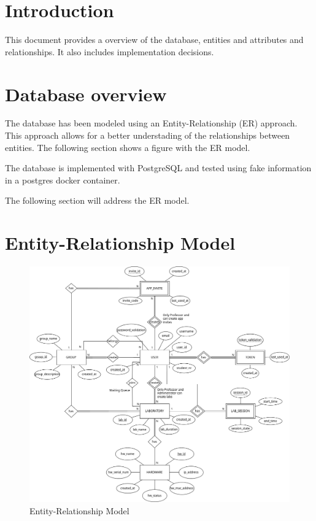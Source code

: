 \documentclass[a4paper,twoside,11pt]{article}
\begin{document}
\section*{Introduction}
This document provides a overview of the database, entities and attributes and relationships. 
It also includes implementation decisions.

\section*{Database overview}
The database has been modeled using an Entity-Relationship (ER) approach.
This approach allows for a better understading of the relationships between entities. The following section shows a figure with the ER model.

The database is implemented with PostgreSQL and tested using fake information in a postgres docker container.

The following section will address the ER model.
\section*{Entity-Relationship Model}
\begin{figure}[htbp]
	\centering
	\includegraphics[width=\textwidth]{../img/ERDiagramRL.drawio}
	\caption{Entity-Relationship Model}
	\label{fig:ERModel}
\end{figure}
\end{document}

